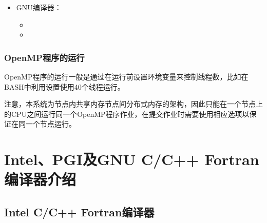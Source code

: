 \documentclass[a4paper,12pt,english]{sphinxmanual}
\begin{document}
\begin{itemize}
\item {} 
\sphinxAtStartPar
GNU编译器：
\begin{itemize}
\item {} 

\item {} 

\end{itemize}

\end{itemize}


\subsection{OpenMP程序的运行}
\label{\detokenize{serial-compiling/serial-compiling:id9}}
\sphinxAtStartPar
OpenMP程序的运行一般是通过在运行前设置环境变量来控制线程数，比如在BASH中利用设置使用40个线程运行。

\sphinxAtStartPar
注意，本系统为节点内共享内存节点间分布式内存的架构，因此只能在一个节点上的CPU之间运行同一个OpenMP程序作业，在提交作业时需要使用相应选项以保证在同一个节点运行。

\sphinxstepscope


\chapter{Intel、PGI及GNU C/C++ Fortran编译器介绍}
\label{\detokenize{compiler/index:intelpgignu-c-c-fortran}}\label{\detokenize{compiler/index::doc}}
\sphinxstepscope


\section{Intel C/C++ Fortran编译器}
\label{\detokenize{compiler/intel:intel-c-c-fortran}}\label{\detokenize{compiler/intel::doc}}
\end{document}

